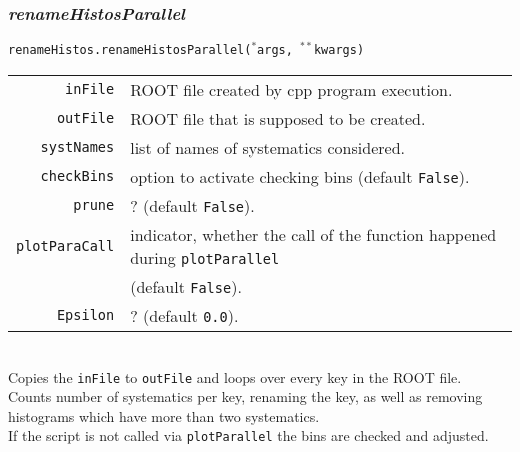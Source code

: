 \documentclass[12pt, a4paper]{article}
\newcommand{\args}{$^*$args}
\newcommand{\kwargs}{$^{**}$kwargs}
\begin{document}
\subsubsection{\textit{renameHistosParallel}}
\texttt{renameHistos.renameHistosParallel(\args, \kwargs)}\\
\begin{tabular}{r|l}
\hline
\texttt{inFile}			& ROOT file created by cpp program execution.\\	
\texttt{outFile}		& ROOT file that is supposed to be created.\\
\texttt{systNames}		& list of names of systematics considered.\\
\texttt{checkBins}		& option to activate checking bins (default \texttt{False}).\\
\texttt{prune}			& ? (default \texttt{False}).\\
\texttt{plotParaCall}	& indicator, whether the call of the function happened during \texttt{plotParallel}\\
						& (default \texttt{False}).\\
\texttt{Epsilon}		& ? (default \texttt{0.0}).\\
\hline
\end{tabular}
\\
Copies the \texttt{inFile} to \texttt{outFile} and loops over every key in the ROOT file.\\
Counts number of systematics per key, renaming the key, as well as removing histograms which have more than two systematics.\\
If the script is not called via \texttt{plotParallel} the bins are checked and adjusted.
\end{document}
